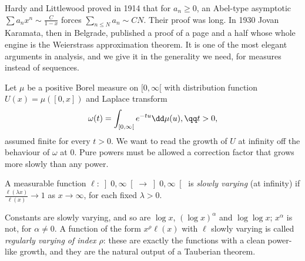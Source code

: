 Hardy and Littlewood proved in 1914 that for $a_n\ge0$, an Abel-type asymptotic $\sum a_nx^n\sim\frac C{1-x}$ forces $\sum_{n\le N}a_n\sim CN$. Their proof
was long. In 1930 Jovan Karamata, then in Belgrade, published a proof of a page and a half whose whole engine is the Weierstrass approximation theorem. It
is one of the most elegant arguments in analysis, and we give it in the generality we need, for measures instead of sequences.

Let $\mu$ be a positive Borel measure on $[0,\infty[$ with distribution function $U(x)=\mu([0,x])$ and Laplace transform
\[
\omega(t)=\int_{[0,\infty[}e^{-tu}\dd\mu(u),\qq t>0,
\]
assumed finite for every $t>0$. We want to read the growth of $U$ at infinity off the behaviour of $\omega$ at $0$. Pure powers must be allowed a
correction factor that grows more slowly than any power.

\begin{definition}
A measurable function $\ell:\left]0,\infty\right[\to\left]0,\infty\right[$ is \emph{slowly varying} (at infinity) if $\frac{\ell(\lambda x)}{\ell(x)}\to1$ as
$x\to\infty$, for each fixed $\lambda>0$.
\end{definition}

Constants are slowly varying, and so are $\log x$, $(\log x)^\alpha$ and $\log\log x$; $x^\alpha$ is not, for $\alpha\ne0$. A function of the form $x^\rho\ell(x)$ with
$\ell$ slowly varying is called \emph{regularly varying of index $\rho$}: these are exactly the functions with a clean power-like growth, and they are the
natural output of a Tauberian theorem.

